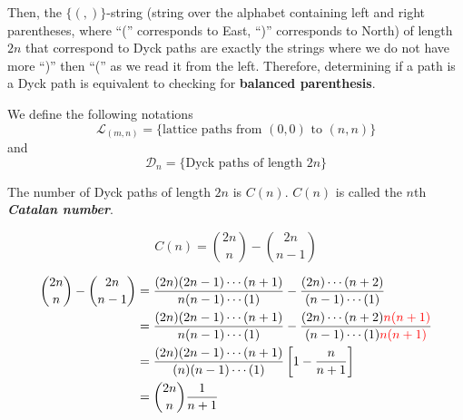 Then, the $\{(,)\}$-string (string over the alphabet containing left and right parentheses, where ``('' corresponds to East, ``)'' corresponds to North) of length $2n$ that correspond to Dyck paths are exactly the strings where we do not have more ``)'' then ``('' as we read it from the left. Therefore, determining if a path is a Dyck path is equivalent to checking for \textbf{balanced parenthesis}.

We define the following notations
$$
\mathcal{L}_{(m,n)} = \{ \text{lattice paths from $(0,0)$ to $(n,n)$} \}
$$
and
$$
\mathcal{D}_{n} = \{ \text{Dyck paths of length $2n$} \}
$$

\begin{definition}
    The number of Dyck paths of length $2n$ is $C(n)$. $C(n)$ is called the $n$th \textit{\textbf{Catalan number}}.
\end{definition}

\begin{theorem}
    $$
    C(n) = \binom{2n}{n} - \binom{2n}{n-1}
    $$
\end{theorem}

\begin{remark}
    $$
    \begin{aligned}
        \binom{2n}{n} - \binom{2n}{n-1} &= \frac{(2n)(2n-1)\cdots (n+1)}{n(n-1)\cdots (1)} - \frac{(2n) \cdots (n+2)}{(n-1) \cdots (1)} \\
        &= \frac{(2n)(2n-1)\cdots (n+1)}{n(n-1)\cdots (1)} - \frac{(2n) \cdots (n+2){\color{red} n(n+1)}}{(n-1) \cdots (1) {\color{red} n(n+1)}} \\
        &= \frac{(2n)(2n-1) \cdots (n+1)}{(n)(n-1) \cdots (1)} \left[ 1 - \frac{n}{n+1} \right] \\
        &= \binom{2n}{n} \frac{1}{n+1}
    \end{aligned}
    $$
\end{remark}

